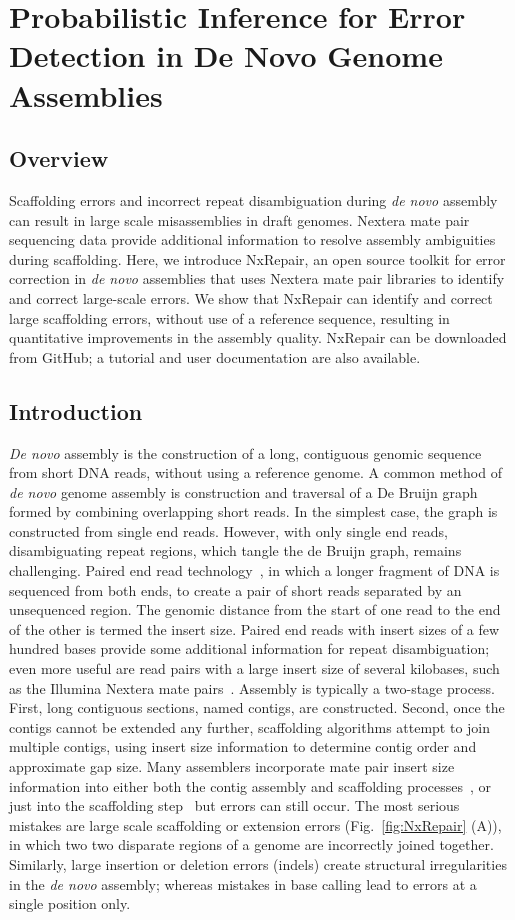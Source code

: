 \chapter{Probabilistic Inference for Error Detection in De Novo Genome Assemblies}
\section{Overview}
Scaffolding errors and incorrect repeat disambiguation during \textit{de novo} assembly can result in large scale misassemblies in draft genomes. Nextera mate pair sequencing data provide additional information to resolve assembly ambiguities during scaffolding. Here, we introduce NxRepair, an open source toolkit for error correction in \textit{de novo} assemblies that uses Nextera mate pair libraries to identify and correct large-scale errors. We show that NxRepair can identify and correct large scaffolding errors, without use of a reference sequence, resulting in quantitative improvements in the assembly quality. NxRepair can be downloaded from GitHub; a tutorial and user documentation are also available.

\section{Introduction}
\textit{De novo} assembly is the construction of a long, contiguous genomic sequence from short DNA reads, without using a reference genome. A common method of \textit{de novo} genome assembly is construction and traversal of a De Bruijn graph~\cite{compeau2011} formed by combining overlapping short reads. In the simplest case, the graph is constructed from single end reads. However, with only single end reads, disambiguating repeat regions, which tangle the de Bruijn graph, remains challenging. Paired end read technology~\cite{Fullwood2009}, in which a longer fragment of DNA is sequenced from both ends, to create a pair of short reads separated by an unsequenced region. The genomic distance from the start of one read to the end of the other is termed the insert size. Paired end reads with insert sizes of a few hundred bases provide some additional information for repeat disambiguation; even more useful are read pairs with a large insert size of several kilobases, such as the Illumina Nextera mate pairs~\cite{nextera2012}. Assembly is typically a two-stage process. First, long contiguous sections, named contigs, are constructed. Second, once the contigs cannot be extended any further, scaffolding algorithms attempt to join multiple contigs, using insert size information to determine contig order and approximate gap size. Many assemblers incorporate mate pair insert size information into either both the contig assembly and scaffolding processes~\cite{Bankevich2012}, or just into the scaffolding step~\cite{zerbino2008} but errors can still occur. The most serious mistakes are large scale scaffolding or extension errors (Fig.~\ref{fig:NxRepair} (A)), in which two two disparate regions of a genome are incorrectly joined together. Similarly, large insertion or deletion errors (indels) create structural irregularities in the \textit{de novo} assembly; whereas mistakes in base calling lead to errors at a single position only. 

